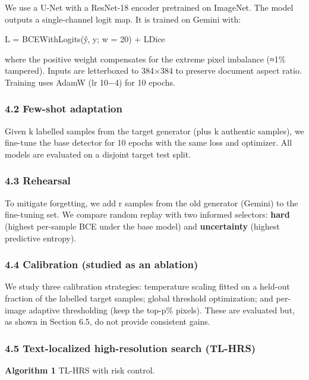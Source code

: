 We use a U-Net with a ResNet-18 encoder pretrained on ImageNet. The model outputs a single-channel logit map. It is trained on Gemini with:

L = BCEWithLogits(ŷ, y; w = 20) + LDice

where the positive weight compensates for the extreme pixel imbalance (≈1\% tampered). Inputs are letterboxed to 384×384 to preserve document aspect ratio. Training uses AdamW (lr 10−4) for 10 epochs.

\subsubsection{4.2 Few-shot adaptation}\label{few-shot-adaptation}

Given k labelled samples from the target generator (plus k authentic samples), we fine-tune the base detector for 10 epochs with the same loss and optimizer. All models are evaluated on a disjoint target test split.

\subsubsection{4.3 Rehearsal}\label{rehearsal}

To mitigate forgetting, we add r samples from the old generator (Gemini) to the fine-tuning set. We compare random replay with two informed selectors: \textbf{hard} (highest per-sample BCE under the base model) and \textbf{uncertainty} (highest predictive entropy).

\subsubsection{4.4 Calibration (studied as an ablation)}\label{calibration-studied-as-an-ablation}

We study three calibration strategies: temperature scaling fitted on a held-out fraction of the labelled target samples; global threshold optimization; and per-image adaptive thresholding (keep the top-p\% pixels). These are evaluated but, as shown in Section 6.5, do not provide consistent gains.

\subsubsection{4.5 Text-localized high-resolution search (TL-HRS)}\label{text-localized-high-resolution-search-tl-hrs}

\textbf{Algorithm 1} TL-HRS with risk control.

